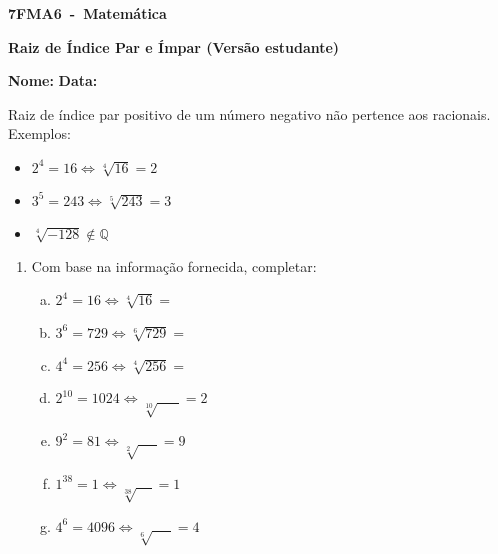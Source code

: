 \documentclass[a4paper,14pt]{article}
\begin{document}
	
	\noindent\textbf{7FMA6~-~Matemática} 
	
	\begin{center}
		\textbf{Raiz de Índice Par e Ímpar (Versão estudante)}
	\end{center}
	
	\bigskip
	
	\noindent\textbf{Nome:} \underline{\hspace{10cm}}
    \noindent\textbf{Data:} \underline{\hspace{4cm}}
	
	\bigskip
	
	\begin{multicols}{2}
        \noindent Raiz de índice par positivo de um número negativo não pertence aos racionais. \\
        Exemplos:
    \begin{itemize}
    	\item $2^4 = 16 \Leftrightarrow \sqrt[4]{16} = 2$
    	\item $3^5 = 243 \Leftrightarrow \sqrt[5]{243} = 3$
    	\item $\sqrt[4]{-128} \notin \mathbb{Q}$
    \end{itemize}
	\begin{enumerate}
		
		\item Com base na informação fornecida, completar:
		\begin{enumerate}[a)]
			\item $2^4 = 16 \Leftrightarrow \sqrt[4]{16} = $
			\item $3^6 = 729 \Leftrightarrow \sqrt[6]{729} = $
			\item $4^4 = 256 \Leftrightarrow \sqrt[4]{256} = $
			\item $2^{10} = 1024 \Leftrightarrow \sqrt[10]{~~~~~~~} = 2$
			\item $9^2 = 81 \Leftrightarrow \sqrt[2]{~~~~~~} = 9$
			\item $1^{38} = 1 \Leftrightarrow \sqrt[38]{~~~~~} = 1$
			\item $4^6 = 4096 \Leftrightarrow \sqrt[6]{~~~~~~} = 4$
	    \end{enumerate}
    

\end{enumerate}
\end{multicols}
\end{document}
